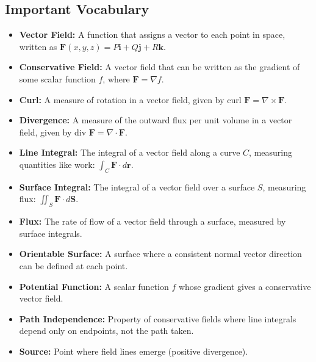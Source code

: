 \newpage

\formsdefs{}

\subsection*{Important Vocabulary}
\begin{itemize}
    \item \textbf{Vector Field:} A function that assigns a vector to each point in space, written as $\mathbf{F}(x,y,z) = P\mathbf{i} + Q\mathbf{j} + R\mathbf{k}$.

    \item \textbf{Conservative Field:} A vector field that can be written as the gradient of some scalar function $f$, where $\mathbf{F} = \nabla f$.

    \item \textbf{Curl:} A measure of rotation in a vector field, given by $\text{curl }\mathbf{F} = \nabla \times \mathbf{F}$.

    \item \textbf{Divergence:} A measure of the outward flux per unit volume in a vector field, given by $\text{div }\mathbf{F} = \nabla \cdot \mathbf{F}$.

    \item \textbf{Line Integral:} The integral of a vector field along a curve $C$, measuring quantities like work: $\int_C \mathbf{F} \cdot d\mathbf{r}$.

    \item \textbf{Surface Integral:} The integral of a vector field over a surface $S$, measuring flux: $\iint_S \mathbf{F} \cdot d\mathbf{S}$.

    \item \textbf{Flux:} The rate of flow of a vector field through a surface, measured by surface integrals.

    \item \textbf{Orientable Surface:} A surface where a consistent normal vector direction can be defined at each point.

    \item \textbf{Potential Function:} A scalar function $f$ whose gradient gives a conservative vector field.

    \item \textbf{Path Independence:} Property of conservative fields where line integrals depend only on endpoints, not the path taken.

    \item \textbf{Source:} Point where field lines emerge (positive divergence).


\end{itemize}

